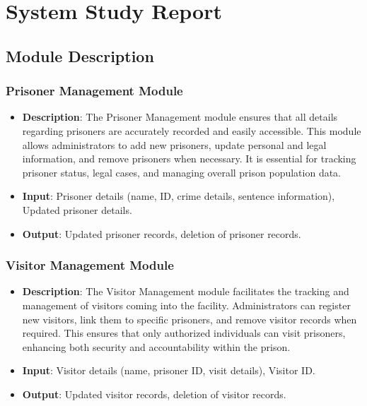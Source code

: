 \chapter{System Study Report}
\section{Module Description}

\subsection*{Prisoner Management Module}
\begin{itemize}
    \item \textbf{Description}: The Prisoner Management module ensures that all details regarding prisoners are accurately recorded and easily accessible. This module allows administrators to add new prisoners, update personal and legal information, and remove prisoners when necessary. It is essential for tracking prisoner status, legal cases, and managing overall prison population data.
    \item \textbf{Input}: Prisoner details (name, ID, crime details, sentence information), Updated prisoner details.
    \item \textbf{Output}: Updated prisoner records, deletion of prisoner records.
\end{itemize}

\subsection*{Visitor Management Module}
\begin{itemize}
    \item \textbf{Description}: The Visitor Management module facilitates the tracking and management of visitors coming into the facility. Administrators can register new visitors, link them to specific prisoners, and remove visitor records when required. This ensures that only authorized individuals can visit prisoners, enhancing both security and accountability within the prison.
    \item \textbf{Input}: Visitor details (name, prisoner ID, visit details), Visitor ID.
    \item \textbf{Output}: Updated visitor records, deletion of visitor records.
\end{itemize}

